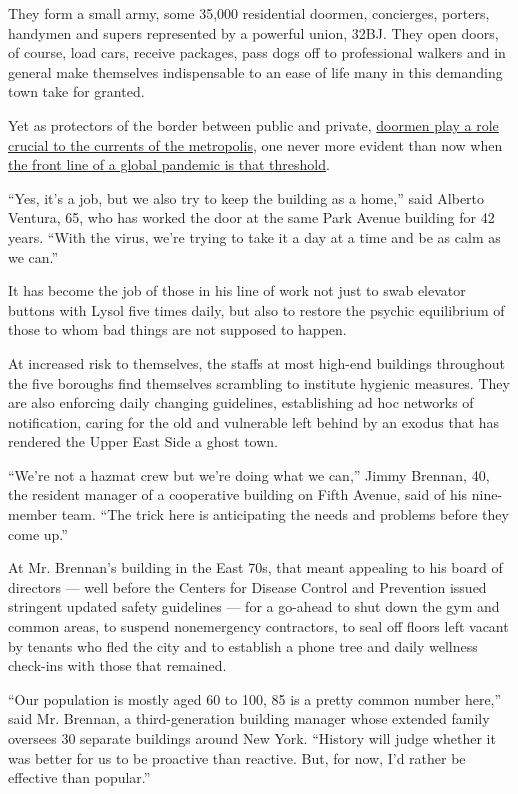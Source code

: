 They form a small army, some 35,000 residential doormen, concierges,
porters, handymen and supers represented by a powerful union, 32BJ. They
open doors, of course, load cars, receive packages, pass dogs off to
professional walkers and in general make themselves indispensable to an
ease of life many in this demanding town take for granted.

Yet as protectors of the border between public and private,
\href{https://www.nytimes.com/2020/03/23/style/doormen-coronavirus.html}{doormen
play a role crucial to the currents of the metropolis}, one never more
evident than now when
\href{https://www.nytimes.com/2020/03/22/nyregion/Coronavirus-new-York-epicenter.html}{the
front line of a global pandemic is that threshold}.

``Yes, it's a job, but we also try to keep the building as a home,''
said Alberto Ventura, 65, who has worked the door at the same Park
Avenue building for 42 years. ``With the virus, we're trying to take it
a day at a time and be as calm as we can.''

It has become the job of those in his line of work not just to swab
elevator buttons with Lysol five times daily, but also to restore the
psychic equilibrium of those to whom bad things are not supposed to
happen.

At increased risk to themselves, the staffs at most high-end buildings
throughout the five boroughs find themselves scrambling to institute
hygienic measures. They are also enforcing daily changing guidelines,
establishing ad hoc networks of notification, caring for the old and
vulnerable left behind by an exodus that has rendered the Upper East
Side a ghost town.

``We're not a hazmat crew but we're doing what we can,'' Jimmy Brennan,
40, the resident manager of a cooperative building on Fifth Avenue, said
of his nine-member team. ``The trick here is anticipating the needs and
problems before they come up.''

At Mr. Brennan's building in the East 70s, that meant appealing to his
board of directors --- well before the Centers for Disease Control and
Prevention issued stringent updated safety guidelines --- for a go-ahead
to shut down the gym and common areas, to suspend nonemergency
contractors, to seal off floors left vacant by tenants who fled the city
and to establish a phone tree and daily wellness check-ins with those
that remained.

``Our population is mostly aged 60 to 100, 85 is a pretty common number
here,'' said Mr. Brennan, a third-generation building manager whose
extended family oversees 30 separate buildings around New York.
``History will judge whether it was better for us to be proactive than
reactive. But, for now, I'd rather be effective than popular.''

